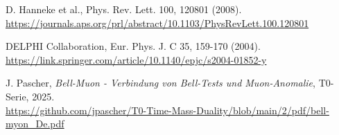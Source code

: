 \documentclass[12pt,a4paper]{article}
\begin{document}
\begin{thebibliography}{99}
	 D. Hanneke et al., Phys. Rev. Lett. 100, 120801 (2008). \\
	\url{https://journals.aps.org/prl/abstract/10.1103/PhysRevLett.100.120801}
	
	 DELPHI Collaboration, Eur. Phys. J. C 35, 159-170 (2004). \\
	\url{https://link.springer.com/article/10.1140/epjc/s2004-01852-y}
	
	 J. Pascher, \textit{Bell-Muon - Verbindung von Bell-Tests und Muon-Anomalie}, T0-Serie, 2025. \\
	\url{https://github.com/jpascher/T0-Time-Mass-Duality/blob/main/2/pdf/bell-myon_De.pdf}
\end{thebibliography}
\end{document}

